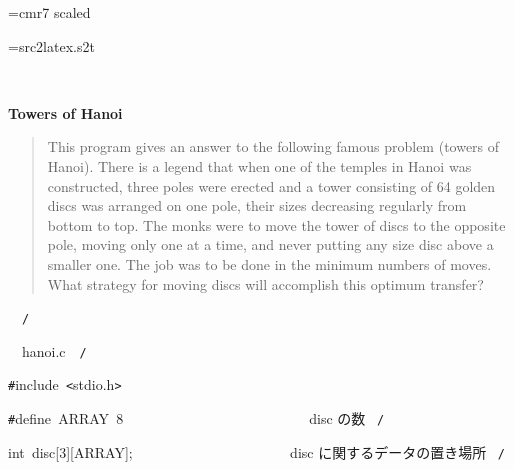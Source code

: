 \documentclass{article}
\begin{document}
\ifx\sevenrm\undefined
  \font\sevenrm=cmr7 scaled 
\fi

\newread\MyStyle
\openin\MyStyle=src2latex.s2t
\ifeof\MyStyle
  \closein\MyStyle
\else
  
  \closein\MyStyle
\fi

\def\mc{\relax}
\def\gt{\relax}
\def\sc{\scshape}

\tt\mc 

\noindent
\rm\mc {\tt /}{\tt *}\  \hrulefill \rm\mc \ {\tt *}

\noindent
\mbox{}\hfill

\noindent
\mbox{}\hfill

\noindent
\mbox{} {}%

\centerline{\bf Towers of Hanoi}

\begin{quote}
\noindent
This program gives an answer to the following famous problem (towers of
Hanoi).
There is a legend that when one of the temples in Hanoi was constructed,
three poles were erected and a tower consisting of 64 golden discs was
arranged on one pole, their sizes decreasing regularly from bottom to top.
The monks were to move the tower of discs to the opposite pole, moving
only one at a time, and never putting any size disc above a smaller one.
The job was to be done in the minimum numbers of moves. What strategy for
moving discs will accomplish this optimum transfer?
\end{quote}


\noindent
\mbox{}\hfill

\noindent
\mbox{}{\tt *}\  \hrulefill \rm\mc \ {\tt *}{\tt /}
\tt\mc 

\noindent
\mbox{}\hfill

\noindent
\mbox{}\rm\mc {\tt /}{\tt *}\  \hrulefill\ hanoi.c\ \hrulefill \rm\mc \ {\tt *}{\tt /}
\tt\mc 

\noindent
\mbox{}\hfill

\noindent
\mbox{}\hfill

\noindent
\mbox{}{\tt\#}include{\tt\mc \ }{\tt <}stdio.h{\tt >}

\noindent
\mbox{}{\tt\#}define{\tt\mc \ }ARRAY{\tt\mc \ }8{\tt\mc \ }{\tt\mc \ \ \ \ \ \ \ \ }{\tt\mc \ \ \ \ \ \ \ \ }{\tt\mc \ \ \ \ \ \ \ \ }\rm\mc {\tt /}{\tt *}\  {}disc の数 \hfill \rm\mc \ {\tt *}{\tt /}
\tt\mc 

\noindent
\mbox{}\hfill

\noindent
\mbox{}int{\tt\mc \ }disc[3][ARRAY];{\tt\mc \ \ \ \ \ }{\tt\mc \ \ \ \ \ \ \ \ }{\tt\mc \ \ \ \ \ \ \ \ }\rm\mc {\tt /}{\tt *}\  {}disc に関するデータの置き場所
					   \hfill \rm\mc \ {\tt *}{\tt /}
\tt\mc 
\end{document}
